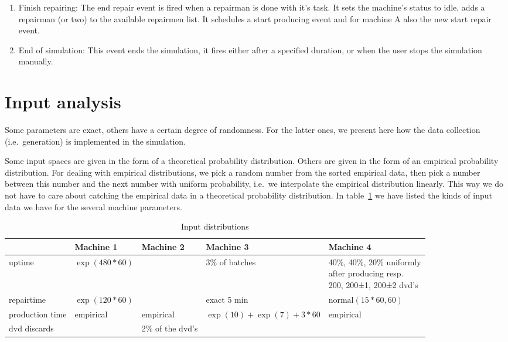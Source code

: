 \documentclass{article}
\begin{document}
\begin{enumerate}
    \item Finish repairing:
        The end repair event is fired when a repairman is done with it's task.
        It sets the machine's status to idle, adds a repairman (or two) to the available repairmen list.
        It schedules a start producing event and for machine A also the new start repair event.

    \item End of simulation:
        This event ends the simulation, it fires either after a specified duration, or when the user stops the simulation manually.
        
\end{enumerate}


\section{Input analysis}
Some parameters are exact, others have a certain degree of randomness.
For the latter ones, we present here how the data collection (i.e.\ generation) is implemented in the simulation.

Some input spaces are given in the form of a theoretical probability distribution.
Others are given in the form of an empirical probability distribution.
For dealing with empirical distributions, we pick a random number from the sorted empirical data, then pick a number between this number and the next number with uniform probability, i.e.\ we interpolate the empirical distribution linearly.
This way we do not have to care about catching the empirical data in a theoretical probability distribution.
In table~\ref{table:input_table} we have listed the kinds of input data we have for the several machine parameters.

\begin{table}[h]
    \begin{tabular}{|l|l|l|l|p{4cm}|}
    \hline
                    & Machine 1         & Machine 2         & Machine 3                     & Machine 4 \\ \hline
    uptime          & $\exp(480*60)$    &                   & 3\% of batches                & \parbox{5cm}{40\%, 40\%, 20\% uniformly\\ after producing resp.\\ 200, 200±1, 200±2 dvd's} \\ \hline
    repairtime      & $\exp(120*60)$    &                   & exact 5 min                   & $\mathrm{normal}(15*60, 60)$ \\ \hline
    production time & empirical         & empirical         & $\exp(10) + \exp(7) + 3*60$   & empirical \\ \hline
    dvd discards    &                   & 2\% of the dvd's  &                               & \\ \hline
    \end{tabular}
    \caption {Input distributions}
    \label{table:input_table}
\end{table}
\end{document}
